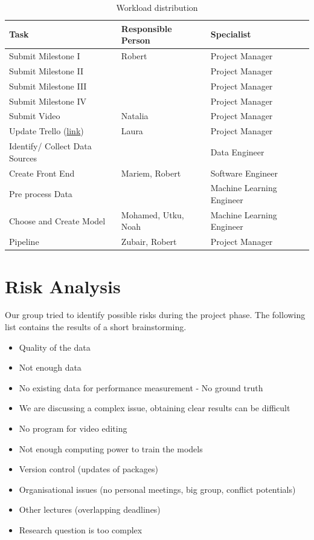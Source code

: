 \documentclass[lang=english,inputenc=utf8,fontsize=10pt]{ldvarticle}
\begin{document}
\begin{table}[ht]
\begin{tabular}{l|l|l}
Task                            & Responsible Person        & Specialist\\ \hline
Submit Milestone I              & Robert                    & Project Manager\\
Submit Milestone II             &                           & Project Manager\\
Submit Milestone III            &                           & Project Manager\\
Submit Milestone IV             &                           & Project Manager\\
Submit Video                    & Natalia                   & Project Manager\\
Update Trello (\href{https://trello.com/b/2Hq25ghV/ami}{link}) & Laura & Project Manager \\
Identify/ Collect Data Sources  &                           & Data Engineer\\
Create Front End                & Mariem, Robert            & Software Engineer\\
Pre process Data                 &                           & Machine Learning Engineer\\
Choose and Create Model          & Mohamed, Utku, Noah       & Machine Learning Engineer\\
Pipeline                        & Zubair, Robert            & Project Manager\\
\end{tabular}
\caption{Workload distribution}
\end{table}

\newpage

\section{Risk Analysis}
Our group tried to identify possible risks during the project phase. The following list contains the results of a short brainstorming.\\

\begin{itemize}
    \item Quality of the data
    \item Not enough data
    \item No existing data for performance measurement - No ground truth
    \item We are discussing a complex issue, obtaining clear results can be difficult
    \item No program for video editing
    \item Not enough computing power to train the models
    \item Version control (updates of packages)
    \item Organisational issues (no personal meetings, big group, conflict potentials)
    \item Other lectures (overlapping deadlines)
    \item Research question is too complex
\end{itemize}
\end{document}
